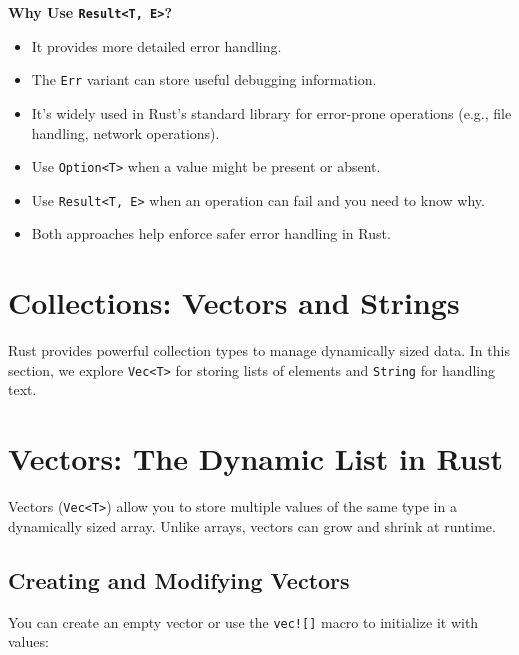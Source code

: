 \documentclass[a4paper,12pt]{report}
\begin{document}
	\textbf{Why Use \texttt{Result<T, E>}?}
	\begin{itemize}
		\item It provides more detailed error handling.
		\item The \texttt{Err} variant can store useful debugging information.
		\item It's widely used in Rust’s standard library for error-prone operations (e.g., file handling, network operations).
	\end{itemize}
	
	\begin{takeawaybox}
		
		\begin{itemize}
			\item Use \texttt{Option<T>} when a value might be present or absent.
			\item Use \texttt{Result<T, E>} when an operation can fail and you need to know why.
			\item Both approaches help enforce safer error handling in Rust.
		\end{itemize}
	\end{takeawaybox}
	
	
	\section{Collections: Vectors and Strings}
	
	Rust provides powerful collection types to manage dynamically sized data. In this section, we explore \texttt{Vec<T>} for storing lists of elements and \texttt{String} for handling text.
	
	\section*{Vectors: The Dynamic List in Rust}
	
	Vectors (\texttt{Vec<T>}) allow you to store multiple values of the same type in a dynamically sized array. Unlike arrays, vectors can grow and shrink at runtime.
	
	\subsection*{Creating and Modifying Vectors}
	
	You can create an empty vector or use the \texttt{vec![]} macro to initialize it with values:
	
\end{document}
